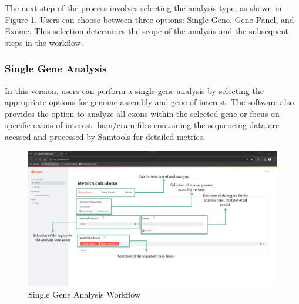 The next step of the process involves selecting the analysis type, as shown in Figure \ref{fig:single_gene}. Users can choose between three options: Single Gene, Gene Panel, and Exome. This selection determines the scope of the analysis and the subsequent steps in the workflow.


\subsubsection{\textbf{Single Gene Analysis}}

In this version, users can perform a single gene analysis by selecting the appropriate options for genome assembly and gene of interest. The software also provides the option to analyze all exons within the selected gene or focus on specific exons of interest. \ac{bam}/\ac{cram} files containing the sequencing data are acessed and processed by Samtools for detailed metrics.

\begin{figure}[H]
    \centering
    \includegraphics[width=\textwidth]{figs/v3.2.png}
    \caption{Single Gene Analysis Workflow}
    \label{fig:single_gene}
\end{figure}

